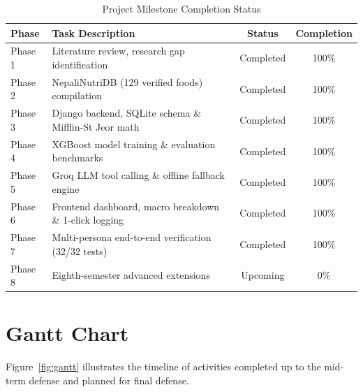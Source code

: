 \documentclass[12pt,a4paper]{report}
\begin{document}
\begin{table}[htbp]
\centering
\caption{Project Milestone Completion Status}
\label{tab:milestones}
\begin{tabular}{llcc}
\toprule
\textbf{Phase} & \textbf{Task Description} & \textbf{Status} & \textbf{Completion} \\
\midrule
Phase 1 & Literature review, research gap identification & Completed & 100\% \\
Phase 2 & NepaliNutriDB (129 verified foods) compilation & Completed & 100\% \\
Phase 3 & Django backend, SQLite schema \& Mifflin-St Jeor math & Completed & 100\% \\
Phase 4 & XGBoost model training \& evaluation benchmarks & Completed & 100\% \\
Phase 5 & Groq LLM tool calling \& offline fallback engine & Completed & 100\% \\
Phase 6 & Frontend dashboard, macro breakdown \& 1-click logging & Completed & 100\% \\
Phase 7 & Multi-persona end-to-end verification (32/32 tests) & Completed & 100\% \\
Phase 8 & Eighth-semester advanced extensions & Upcoming & 0\% \\
\bottomrule
\end{tabular}
\end{table}

\section{Gantt Chart}

Figure~\ref{fig:gantt} illustrates the timeline of activities completed up to the mid-term defense and planned for final defense.
\end{document}
